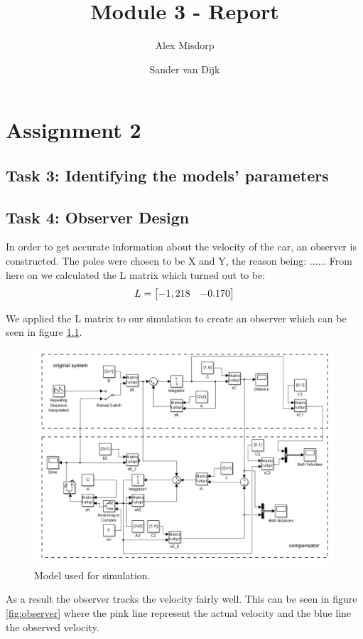 \documentclass[final]{scrreprt} %
\title{Module 3 - Report}
\author{Alex {Misdorp} \and Sander {van Dijk}}
\begin{document}
\chapter{Assignment 2}
\section*{Task 3: Identifying the models' parameters}
\section*{Task 4: Observer Design}
In order to get accurate information about the velocity of the car, an observer is constructed. The poles were chosen to be X and Y, the reason being: ...... From here on we calculated the L matrix which turned out to be:
\begin{equation}
\centering
L =
\begin{bmatrix}
  -1,218 & -0.170
\end{bmatrix}
\end{equation}

We applied the L matrix to our simulation to create an observer which can be seen in figure \ref{fig:simcircuit}.

\begin{figure}[h!]
\centering
\includegraphics[width=\linewidth]{res/model-rest.png}
\caption{Model used for simulation.}
\label{fig:simcircuit}
\end{figure}

As a result the observer tracks the velocity fairly well. This can be seen in figure \ref{fig:observer} where the pink line represent the actual velocity and the blue line the observed velocity. 
\end{document}

